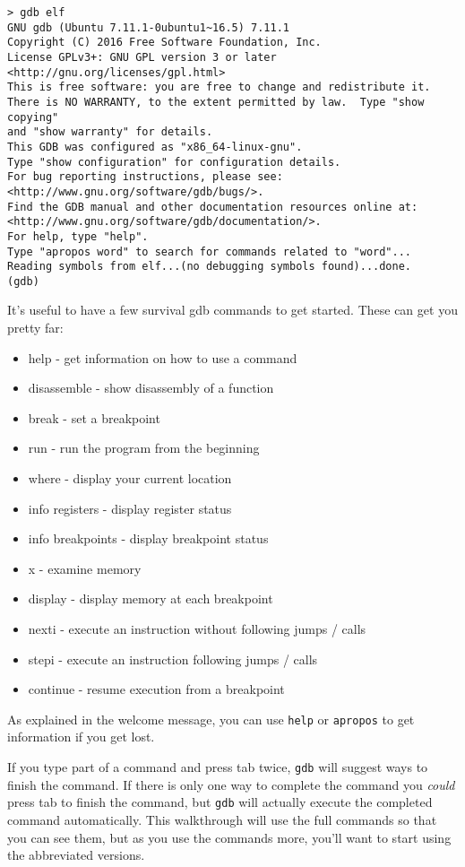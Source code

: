 \documentclass{article}
\begin{document}
\begin{lstlisting}
> gdb elf
GNU gdb (Ubuntu 7.11.1-0ubuntu1~16.5) 7.11.1
Copyright (C) 2016 Free Software Foundation, Inc.
License GPLv3+: GNU GPL version 3 or later <http://gnu.org/licenses/gpl.html>
This is free software: you are free to change and redistribute it.
There is NO WARRANTY, to the extent permitted by law.  Type "show copying"
and "show warranty" for details.
This GDB was configured as "x86_64-linux-gnu".
Type "show configuration" for configuration details.
For bug reporting instructions, please see:
<http://www.gnu.org/software/gdb/bugs/>.
Find the GDB manual and other documentation resources online at:
<http://www.gnu.org/software/gdb/documentation/>.
For help, type "help".
Type "apropos word" to search for commands related to "word"...
Reading symbols from elf...(no debugging symbols found)...done.
(gdb) 
\end{lstlisting}

It's useful to have a few survival gdb commands to get started. These can get
you pretty far:

\begin{itemize}
    \item help - get information on how to use a command
    \item disassemble - show disassembly of a function
    \item break - set a breakpoint
    \item run - run the program from the beginning
    \item where - display your current location
    \item info registers - display register status
    \item info breakpoints - display breakpoint status
    \item x - examine memory
    \item display - display memory at each breakpoint
    \item nexti - execute an instruction without following jumps / calls
    \item stepi - execute an instruction following jumps / calls
    \item continue - resume execution from a breakpoint
\end{itemize}

As explained in the welcome message, you can use \texttt{help} or
\texttt{apropos} to get information if you get lost.

If you type part of a command and press tab twice, \texttt{gdb} will suggest
ways to finish the command. If there is only one way to complete the command you
\emph{could} press tab to finish the command, but \texttt{gdb} will actually
execute the completed command automatically. This walkthrough will use the full
commands so that you can see them, but as you use the commands more, you'll want
to start using the abbreviated versions.
\end{document}
